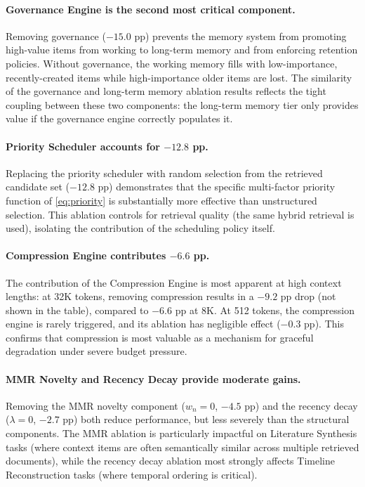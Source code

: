 \documentclass[review,12pt]{elsarticle}
\begin{document}
\paragraph{Governance Engine is the second most critical component.}
Removing governance ($-15.0$ pp) prevents the memory system from promoting
high-value items from working to long-term memory and from enforcing
retention policies.  Without governance, the working memory fills with
low-importance, recently-created items while high-importance older items are
lost.  The similarity of the governance and long-term memory ablation results
reflects the tight coupling between these two components: the long-term memory
tier only provides value if the governance engine correctly populates it.

\paragraph{Priority Scheduler accounts for $-12.8$ pp.}
Replacing the priority scheduler with random selection from the retrieved
candidate set ($-12.8$ pp) demonstrates that the specific multi-factor
priority function of \cref{eq:priority} is substantially more effective
than unstructured selection.  This ablation controls for retrieval quality
(the same hybrid retrieval is used), isolating the contribution of the
scheduling policy itself.

\paragraph{Compression Engine contributes $-6.6$ pp.}
The contribution of the Compression Engine is most apparent at high context
lengths: at 32K tokens, removing compression results in a $-9.2$ pp drop
(not shown in the table), compared to $-6.6$ pp at 8K.  At 512 tokens,
the compression engine is rarely triggered, and its ablation has negligible
effect ($-0.3$ pp).  This confirms that compression is most valuable as
a mechanism for graceful degradation under severe budget pressure.

\paragraph{MMR Novelty and Recency Decay provide moderate gains.}
Removing the MMR novelty component ($w_n = 0$, $-4.5$ pp) and the recency
decay ($\lambda = 0$, $-2.7$ pp) both reduce performance, but less severely
than the structural components.  The MMR ablation is particularly impactful
on Literature Synthesis tasks (where context items are often semantically
similar across multiple retrieved documents), while the recency decay ablation
most strongly affects Timeline Reconstruction tasks (where temporal ordering
is critical).
\end{document}
